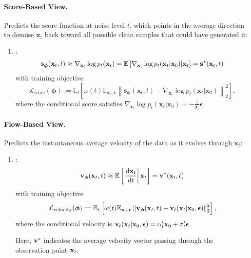 \paragraph{Score-Based View.} Predicts the score function at noise level $t$, which points in the average direction to denoise $\mathbf{x}_t$ back toward all possible clean samples that could have generated it:
\begin{enumerate}
    \item[3.]   \citep{song2019generative,song2020score}:
    \begin{equation}\label{eq:score-def}
        \mathbf{s}_{\bm{\phi}}(\mathbf{x}_t,t) \approx \nabla_{\mathbf{x}_t} \log p_t(\mathbf{x}_t) = \mathbb{E}\left[\nabla_{\mathbf{x}_t} \log p_t(\mathbf{x}_t|\mathbf{x}_0) |\mathbf{x}_t\right] = {\mathbf{s}}^*({\mathbf{x}}_t, t)
    \end{equation}
    with training objective
    \[
        \mathcal{L}_{\text{score}}(\bm{\phi}) := \mathbb{E}_t \left[\omega(t) \mathbb{E}_{\mathbf{x}_0, \bm{\epsilon}} \left\| \mathbf{s}_{\bm{\phi}}(\mathbf{x}_t,t) - \nabla_{\mathbf{x}_t} \log p_t(\mathbf{x}_t|\mathbf{x}_0) \right\|_2^2 \right],
    \]
    where the conditional score satisfies $\nabla_{\mathbf{x}_t} \log p_t(\mathbf{x}_t|\mathbf{x}_0) = -\frac{1}{\sigma_t} \bm{\epsilon}$.
\end{enumerate}


\paragraph{Flow-Based View.} Predicts the instantaneous average velocity of the data as it evolves through $\mathbf{x}_t$:
\begin{enumerate}
    \item[4.]  \citep{lipman2022flow,liu2022rectified,salimans2021progressive,albergo2023stochastic}:
    \begin{equation}\label{eq:velocity-def}
        \mathbf{v}_{\bm{\phi}}(\mathbf{x}_t, t) \approx \mathbb{E}\left[\left. \frac{\mathop{}\!\mathrm{d}  \mathbf{x}_t}{\mathop{}\!\mathrm{d}  t} \right| {\mathbf{x}_t}\right] ={\mathbf{v}}^*({\mathbf{x}}_t, t)
    \end{equation}
    with training objective
    \[
        \mathcal{L}_{\text{velocity}}(\bm{\phi}) := \mathbb{E}_t \left[\omega(t) \mathbb{E}_{\mathbf{x}_0, \bm{\epsilon}} \left\| \mathbf{v}_{\bm{\phi}}(\mathbf{x}_t,t) - {\mathbf{v}}_t({\mathbf{x}}_t | {\mathbf{x}}_0,\bm{\epsilon}) \right\|_2^2 \right],
    \]
    where the conditional velocity is ${\mathbf{v}}_t({\mathbf{x}}_t|{\mathbf{x}}_0,\bm{\epsilon}) = \alpha_t' \mathbf{x}_0 + \sigma_t' \bm{\epsilon}$.

Here, ${\mathbf{v}}^*$ indicates the average velocity vector passing through the observation point ${\mathbf{x}}_t$.
\end{enumerate}


